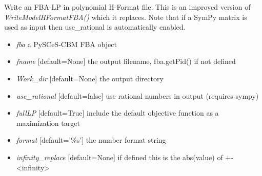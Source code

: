 \documentclass[a4paper,11pt,english]{sphinxmanual}
\begin{document}
\begin{fulllineitems}
\label{modules_doc:cbmpy.CBWrite.writeModelHFormatFBA2}
Write an FBA-LP in polynomial H-Format file. This is an improved version of \emph{WriteModelHFormatFBA()}
which it replaces. Note that if a SymPy matrix is used as input then use\_rational is automatically enabled.
\begin{itemize}
\item {} 
\emph{fba} a PySCeS-CBM FBA object

\item {} 
\emph{fname} {[}default=None{]} the output filename, fba.getPid() if not defined

\item {} 
\emph{Work\_dir} {[}default=None{]} the output directory

\item {} 
\emph{use\_rational} {[}default=false{]} use rational numbers in output (requires sympy)

\item {} 
\emph{fullLP} {[}default=True{]} include the default objective function as a maximization target

\item {} 
\emph{format} {[}default='\%s'{]} the number format string

\item {} 
\emph{infinity\_replace} {[}default=None{]} if defined this is the abs(value) of +-\textless{}infinity\textgreater{}

\end{itemize}

\end{fulllineitems}

\end{document}
